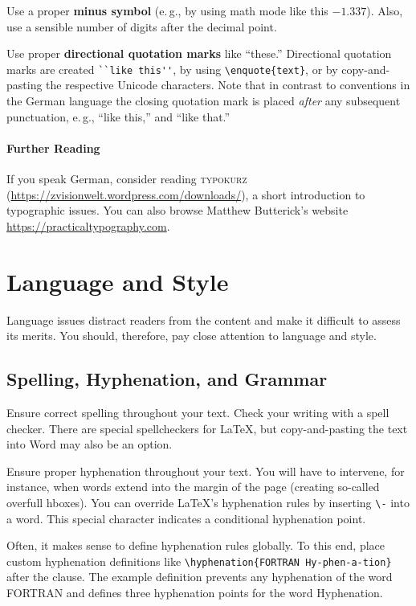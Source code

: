 Use a proper \textbf{minus symbol} (e.\,g., by using math mode like this \(-1.337\)). Also, use a sensible number of digits after the decimal point.

Use proper \textbf{directional quotation marks} like ``these.'' Directional quotation marks are created  \verb|``like this''|, by using \verb|\enquote{text}|, or by copy-and-pasting the respective Unicode characters. Note that in contrast to conventions in the German language the closing quotation mark is placed \emph{after} any subsequent punctuation, e.\,g., ``like this,'' and ``like that.''

\paragraph{Further Reading}

If you speak German, consider reading \textsc{typokurz} (\url{https://zvisionwelt.wordpress.com/downloads/}), a short introduction to typographic issues. You can also browse Matthew Butterick's website \url{https://practicaltypography.com}.

\section{Language and Style}

Language issues distract readers from the content and make it difficult to assess its merits. You should, therefore, pay close attention to language and style.

\subsection{Spelling, Hyphenation, and Grammar}

Ensure correct spelling throughout your text. Check your writing with a spell checker. There are special spellcheckers for LaTeX, but copy-and-pasting the text into Word may also be an option.

Ensure proper hyphenation throughout your text. You will have to intervene, for instance, when words extend into the margin of the page (creating so-called overfull hboxes). You can override LaTeX's hyphenation rules by inserting \verb|\-| into a word. This special character indicates a conditional hyphenation point.

Often, it makes sense to define hyphenation rules globally. To this end, place custom hyphenation definitions like \verb|\hyphenation{FORTRAN Hy-phen-a-tion}| after the \verb|| clause. The example definition prevents any hyphenation of the word FORTRAN and defines three hyphenation points for the word Hyphenation.

